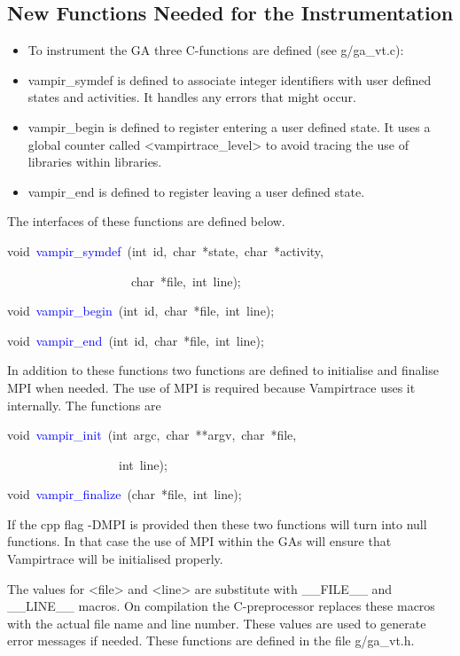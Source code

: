 \subsection{New Functions Needed for the Instrumentation}
\begin{itemize}
\item To instrument the GA three C-functions are defined (see g/ga\_vt.c): 
\item vampir\_symdef is defined to associate integer identifiers with user
defined states and activities. It handles any errors that might occur. 
\item vampir\_begin is defined to register entering a user defined state.
It uses a global counter called <vampirtrace\_level> to avoid tracing
the use of libraries within libraries. 
\item vampir\_end is defined to register leaving a user defined state.
\end{itemize}
The interfaces of these functions are defined below.
\begin{lyxcode}
void~\textcolor{blue}{vampir\_symdef}~(int~id,~char~{*}state,~char~{*}activity,~

~~~~~~~~~~~~~~~~~~~~char~{*}file,~int~line);~

void~\textcolor{blue}{vampir\_begin}~(int~id,~char~{*}file,~int~line);~

void~\textcolor{blue}{vampir\_end}~(int~id,~char~{*}file,~int~line);
\end{lyxcode}
In addition to these functions two functions are defined to initialise
and finalise MPI when needed. The use of MPI is required because Vampirtrace
uses it internally. The functions are
\begin{lyxcode}
void~\textcolor{blue}{vampir\_init}~(int~argc,~char~{*}{*}argv,~char~{*}file,~

~~~~~~~~~~~~~~~~~~int~line);~

void~\textcolor{blue}{vampir\_finalize}~(char~{*}file,~int~line);
\end{lyxcode}
If the cpp flag -DMPI is provided then these two functions will turn
into null functions. In that case the use of MPI within the GAs will
ensure that Vampirtrace will be initialised properly.

The values for <file> and <line> are substitute with \_\_FILE\_\_
and \_\_LINE\_\_ macros. On compilation the C-preprocessor replaces
these macros with the actual file name and line number. These values
are used to generate error messages if needed. These functions are
defined in the file g/ga\_vt.h.

